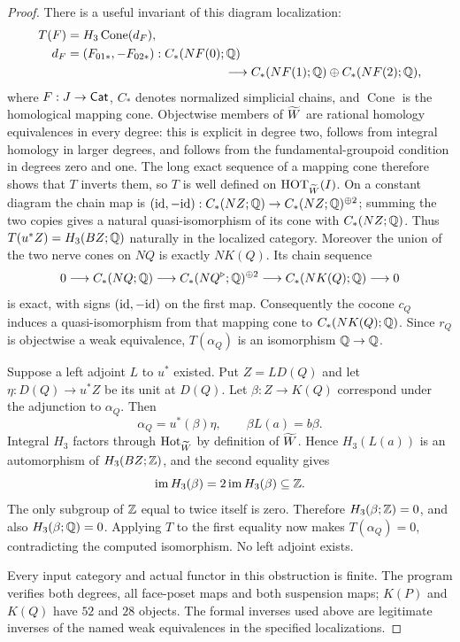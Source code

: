 \begin{proof}
There is a useful invariant of this diagram localization:
\[
\begin{aligned}
 T(F)&=H_3\operatorname{Cone}(d_F),\\
 d_F&=(F_{01*},-F_{02*}):C_*(NF(0);\Q)\\
 &\hspace{45mm}\longrightarrow
 C_*(NF(1);\Q)\oplus C_*(NF(2);\Q),
\end{aligned}
\]
where $F:J\to\mathsf{Cat}$, $C_*$ denotes normalized simplicial chains,
and $\operatorname{Cone}$ is the homological mapping cone.
Objectwise members of $\widetilde W$ are rational homology equivalences in
every degree: this is explicit in degree two, follows from integral
homology in larger degrees, and follows from the fundamental-groupoid
condition in degrees zero and one.  The long exact sequence of a
mapping cone therefore shows that $T$ inverts them, so $T$ is well
defined on $\operatorname{HOT}_{\widetilde W}(I)$.  On a constant diagram the chain map is
$(\mathrm{id},-\mathrm{id}):C_*(NZ;\mathbb Q)\to C_*(NZ;\mathbb Q)^{\oplus2}$; summing the
two copies gives a natural quasi-isomorphism of its cone with
$C_*(NZ;\mathbb Q)$.  Thus $T(u^*Z)=H_3(BZ;\mathbb Q)$ naturally in the
localized category.  Moreover the union of the two nerve cones on
$NQ$ is exactly $NK(Q)$.  Its chain sequence
\[
0\longrightarrow C_*(NQ;\mathbb Q)
\longrightarrow C_*(NQ^{\triangleright};\mathbb Q)^{\oplus2}
\longrightarrow C_*(NK(Q);\mathbb Q)\longrightarrow0
\]
is exact, with signs $(\mathrm{id},-\mathrm{id})$ on the first map.  Consequently
the cocone $c_Q$ induces a quasi-isomorphism from that mapping cone
to $C_*(NK(Q);\mathbb Q)$.  Since $r_Q$ is objectwise a weak equivalence,
$T(\alpha_Q)$ is an isomorphism $\mathbb Q\to\mathbb Q$.

Suppose a left adjoint $L$ to $u^*$ existed.  Put $Z=LD(Q)$ and let
$\eta:D(Q)\to u^*Z$ be its unit at $D(Q)$.  Let
$\beta:Z\to K(Q)$ correspond under the adjunction to $\alpha_Q$.
Then
\[
 \alpha_Q=u^*(\beta)\eta,
 \qquad \beta L(a)=b\beta.
\]
Integral $H_3$ factors through $\operatorname{Hot}_{\widetilde W}$ by definition of
$\widetilde W$.  Hence $H_3(L(a))$ is an automorphism of $H_3(BZ;\mathbb Z)$,
and the second equality gives
\[
 \operatorname{im}H_3(\beta)
       =2\operatorname{im}H_3(\beta)\subseteq\mathbb Z.
\]
The only subgroup of $\mathbb Z$ equal to twice itself is zero.  Therefore
$H_3(\beta;\mathbb Z)=0$, and also $H_3(\beta;\mathbb Q)=0$.  Applying $T$ to
the first equality now makes $T(\alpha_Q)=0$, contradicting the
computed isomorphism.  No left adjoint exists.

Every input category and actual functor in this obstruction is finite.
The program verifies both degrees, all face-poset maps and both
suspension maps; $K(P)$ and $K(Q)$ have $52$ and $28$ objects.
The formal inverses used above are legitimate inverses of the named
weak equivalences in the specified localizations.
\end{proof}

